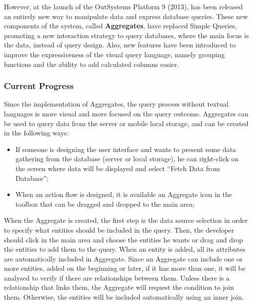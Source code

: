 However, at the launch of the OutSystems Platform 9 (2013), has been released an entirely new way to manipulate data and express database queries. These new components of the system, called \textbf{Aggregates}, have replaced Simple Queries, promoting a new interaction strategy to query databases, where the main focus is the data, instead of query design. Also, new features have been introduced to improve the expressiveness of the visual query language, namely grouping functions and the ability to add calculated columns easier.


\subsubsection{Current Progress}
\label{subsubsec:current_progress}

Since the implementation of Aggregates, the query process without textual languages is more visual and more focused on the query outcome. Aggregates can be used to query data from the server or mobile local storage, and can be created in the following ways:

\begin{itemize}
	\item If someone is designing the user interface and wants to present some data gathering from the database (server or local storage), he can right-click on the screen where data will be displayed and select “Fetch Data from Database”;
	\item When an action flow is designed, it is available an Aggregate icon in the toolbox that can be dragged and dropped to the main area;
\end{itemize}

When the Aggregate is created, the first step is the data source selection in order to specify what entities should be included in the query. Then, the developer should click in the main area and choose the entities he wants or drag and drop the entities to add them to the query. When an entity is added, all its attributes are automatically included in Aggregate. Since an Aggregate can include one or more entities, added on the beginning or later, if it has more than one, it will be analysed to verify if there are relationships between them. Unless there is a relationship that links them, the Aggregate will request the condition to join them. Otherwise, the entities will be included automatically using an inner join.



